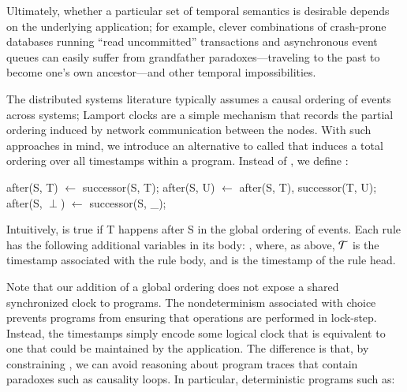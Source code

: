 Ultimately, whether a particular set of temporal semantics is
desirable depends on the underlying application; for example, clever
combinations of crash-prone databases running ``read uncommitted''
transactions and asynchronous event queues can easily suffer from
grandfather paradoxes---traveling to the past to become one's own
ancestor---and other temporal impossibilities.


The distributed systems literature typically assumes a causal ordering
of events across systems; Lamport clocks are a simple mechanism that
records the partial ordering induced by network communication between
the nodes.  With such approaches in mind, we introduce an alternative
to  called  that induces a total
ordering over all timestamps within a \lang program.  Instead of , we define :

\begin{Dedalus}
after(S, T) \(\leftarrow\) successor(S, T);
after(S, U) \(\leftarrow\) after(S, T), successor(T, U);
after(S, \(\perp\)) \(\leftarrow\) successor(S, _);
\end{Dedalus}

Intuitively,  is true if T happens after S in the
global ordering of events.  Each  rule has the
following additional variables in its body:
, where, as
above, $\mathcal{T}$ is the timestamp associated with the rule body, and
 is the timestamp of the rule head.

Note that our addition of a global ordering does not expose a shared
synchronized clock to \lang programs.  The nondeterminism associated
with choice prevents programs from ensuring that operations are
performed in lock-step.  Instead, the timestamps simply encode some
logical clock that is equivalent to one that could be maintained by
the application.  The difference is that, by constraining
, we can avoid reasoning about program traces that
contain paradoxes such as causality loops.  In particular, deterministic programs such as:

